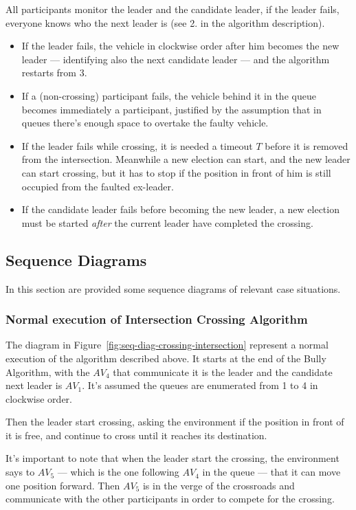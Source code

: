 \documentclass{memoir}
\begin{document}
All participants monitor the leader and the candidate leader, if the leader fails, everyone knows who the next leader is (see 2. in the algorithm description).

\begin{itemize}
	\item If the leader fails, the vehicle in clockwise order after him becomes the new leader --- identifying also the next candidate leader --- and the algorithm restarts from 3.
	\item If a (non-crossing) participant fails, the vehicle behind it in the queue becomes immediately a participant, justified by the assumption that in queues there's enough space to overtake the faulty vehicle.
	\item If the leader fails while crossing, it is needed a timeout $T$ before it is removed from the intersection. Meanwhile a new election can start, and the new leader can start crossing, but it has to stop if the position in front of him is still occupied from the faulted ex-leader.
	\item If the candidate leader fails before becoming the new leader, a new election must be started \emph{after} the current leader have completed the crossing.
\end{itemize}

\subsection{Sequence Diagrams}
In this section are provided some sequence diagrams of relevant case situations.

\subsubsection{Normal execution of Intersection Crossing Algorithm}
The diagram in Figure~\ref{fig:seq-diag-crossing-intersection} represent a normal execution of the algorithm described above. It starts at the end of the Bully Algorithm, with the $AV_4$ that communicate it is the leader and the candidate next leader is $AV_1$. It's assumed the queues are enumerated from 1 to 4 in clockwise order.

Then the leader start crossing, asking the environment if the position in front of it is free, and continue to cross until it reaches its destination.

It's important to note that when the leader start the crossing, the environment says to $AV_5$ --- which is the one following $AV_4$ in the queue --- that it can move one position forward. Then $AV_5$ is in the verge of the crossroads and communicate with the other participants in order to compete for the crossing.
\end{document}
